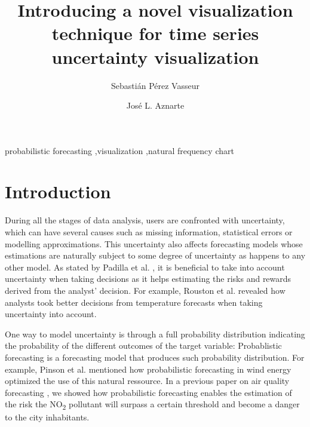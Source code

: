 \documentclass[a4paper,3p,sort&compress]{elsarticle}
\begin{document}
\linenumbers

\newcommand{\no}{NO\textsubscript{2}\xspace}
\newcommand{\ts}{\textsuperscript}

\begin{frontmatter}

  \title{Introducing a novel visualization technique for time series uncertainty visualization}


  \author{Sebasti\'an P\'erez Vasseur}
  \author{Jos\'e L. Aznarte}
  \address{Artificial Intelligence Department\\Universidad Nacional de
    Educaci\'on a Distancia --- UNED\\c/ Juan del Rosal, 16, Madrid, Spain}
  

\begin{abstract}
  
\end{abstract}

\begin{keyword}
probabilistic forecasting \sep visualization \sep natural frequency chart
\end{keyword}

\end{frontmatter}


\section{Introduction}
\label{sec:intro}

During all the stages of data analysis, users are confronted with uncertainty, which can have 
several causes such as missing information, statistical errors or modelling approximations.
This uncertainty also affects forecasting models whose estimations are naturally 
subject to some degree of uncertainty as happens to any other model. 
As stated by Padilla et al. \cite{padilla_uncertainty_2021}, it is beneficial to take into account uncertainty 
when taking decisions as it helps estimating the risks and rewards derived from the analyst'
decision. For example, Rouston et al. \cite{roulston_laboratory_2006} 
revealed how analysts 
took better decisions from temperature forecasts when taking uncertainty into account. 

One way to model uncertainty is through a full 
probability distribution indicating the probability of the different outcomes of the target variable:
Probablistic forecasting is a forecasting model that produces such probability distribution.
For example, Pinson et al. \cite{pinson_non-parametric_2007} mentioned how probabilistic forecasting 
in wind energy optimized the use of this natural ressource. In a previous paper on air quality forecasting 
\cite{vasseur_comparing_2021}, we showed 
how probabilistic forecasting enables the estimation of the risk the \no pollutant will surpass a certain threshold 
and become a danger to the city inhabitants. 
\end{document}
